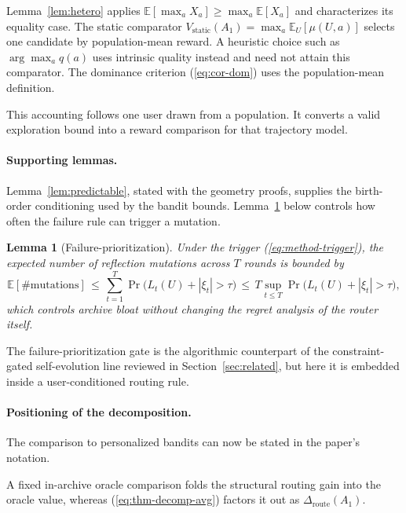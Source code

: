 \documentclass{article} %
\newtheorem{lemma}[theorem]{Lemma}
\providecommand{\E}{\mathbb{E}}
\renewcommand{\eqref}[1]{\textup{(\ref{#1})}}
\begin{document}
Lemma~\ref{lem:hetero} applies $\E[\max_a X_a]\ge\max_a\E[X_a]$ and characterizes its equality case. The static comparator $V_{\mathrm{static}}(A_1)=\max_a\E_U[\mu(U,a)]$ selects one candidate by population-mean reward. A heuristic choice such as $\arg\max_a q(a)$ uses intrinsic quality instead and need not attain this comparator. The dominance criterion \eqref{eq:cor-dom} uses the population-mean definition.

This accounting follows one user drawn from a population. It converts a
valid exploration bound into a reward comparison for that trajectory model.

\paragraph{Supporting lemmas.}

\label{sec:method-supporting}

Lemma~\ref{lem:predictable}, stated with the geometry proofs, supplies the
birth-order conditioning used by the bandit bounds.
Lemma~\ref{lem:failure} below controls how often the failure rule can trigger
a mutation.

\begin{lemma}[Failure-prioritization]
\label{lem:failure}
Under the trigger \eqref{eq:method-trigger}, the expected number of reflection mutations across $T$ rounds is bounded by
\begin{equation}
\label{eq:lem-failure}
\E[\#\mathrm{mutations}]
\,\le\,
\sum_{t=1}^{T}\Pr\bigl(L_t(U)+|\xi_t|>\tau\bigr)
\,\le\,
T\sup_{t\le T}\Pr\bigl(L_t(U)+|\xi_t|>\tau\bigr),
\end{equation}
which controls archive bloat without changing the regret analysis of the router itself.
\end{lemma}

The failure-prioritization gate is the algorithmic counterpart of the constraint-gated self-evolution line reviewed in Section~\ref{sec:related}, but here it is embedded inside a user-conditioned routing rule.

\paragraph{Positioning of the decomposition.}
The comparison to personalized bandits can now be stated in the paper's notation.

A fixed in-archive oracle comparison folds the structural routing gain into the oracle value, whereas \eqref{eq:thm-decomp-avg} factors it out as $\Delta_{\mathrm{route}}(A_1)$.
\end{document}
